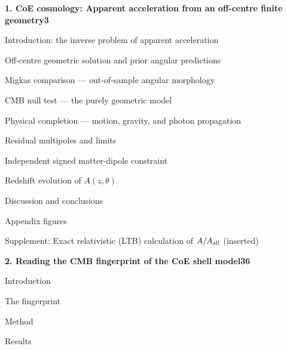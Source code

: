 \documentclass[11pt,a4paper]{article}
\begin{document}
{\small
\noindent\textbf{1. CoE cosmology: Apparent acceleration from an off-centre finite geometry}\dotfill\textbf{3}\par\smallskip
\noindent\hspace*{1.2em}Introduction: the inverse problem of apparent acceleration\par
\noindent\hspace*{1.2em}Off-centre geometric solution and prior angular predictions\par
\noindent\hspace*{1.2em}Migkas comparison — out-of-sample angular morphology\par
\noindent\hspace*{1.2em}CMB null test — the purely geometric model\par
\noindent\hspace*{1.2em}Physical completion — motion, gravity, and photon propagation\par
\noindent\hspace*{1.2em}Residual multipoles and limits\par
\noindent\hspace*{1.2em}Independent signed matter-dipole constraint\par
\noindent\hspace*{1.2em}Redshift evolution of $A(z,\theta)$\par
\noindent\hspace*{1.2em}Discussion and conclusions\par
\noindent\hspace*{1.2em}Appendix figures\par
\noindent\hspace*{1.2em}Supplement: Exact relativistic (LTB) calculation of $A/A_{\rm all}$ (inserted)\par
\noindent\textbf{2. Reading the CMB fingerprint of the CoE shell model}\dotfill\textbf{36}\par\smallskip
\noindent\hspace*{1.2em}Introduction\par
\noindent\hspace*{1.2em}The fingerprint\par
\noindent\hspace*{1.2em}Method\par
\noindent\hspace*{1.2em}Results\par
}
\end{document}
